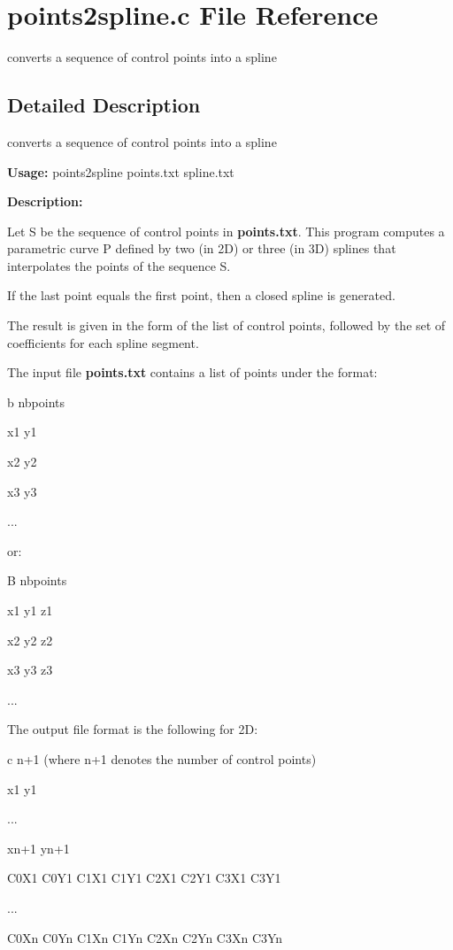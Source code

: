\section{points2spline.c File Reference}
\label{points2spline_8c}
converts a sequence of control points into a spline 



\subsection{Detailed Description}
converts a sequence of control points into a spline 

{\bf Usage:} points2spline points.txt spline.txt

{\bf Description:}

Let S be the sequence of control points in {\bf points.txt}. This program computes a parametric curve P defined by two (in 2D) or three (in 3D) splines that interpolates the points of the sequence S.

If the last point equals the first point, then a closed spline is generated.

The result is given in the form of the list of control points, followed by the set of coefficients for each spline segment.

The input file {\bf points.txt} contains a list of points under the format:

b nbpoints\par
 x1 y1\par
 x2 y2\par
 x3 y3\par
 ...\par


or:

B nbpoints\par
 x1 y1 z1\par
 x2 y2 z2\par
 x3 y3 z3\par
 ...\par


The output file format is the following for 2D:

c n+1 (where n+1 denotes the number of control points)\par
 x1 y1\par
 ...\par
 xn+1 yn+1\par
 C0X1 C0Y1 C1X1 C1Y1 C2X1 C2Y1 C3X1 C3Y1\par
 ...\par
 C0Xn C0Yn C1Xn C1Yn C2Xn C2Yn C3Xn C3Yn\par


